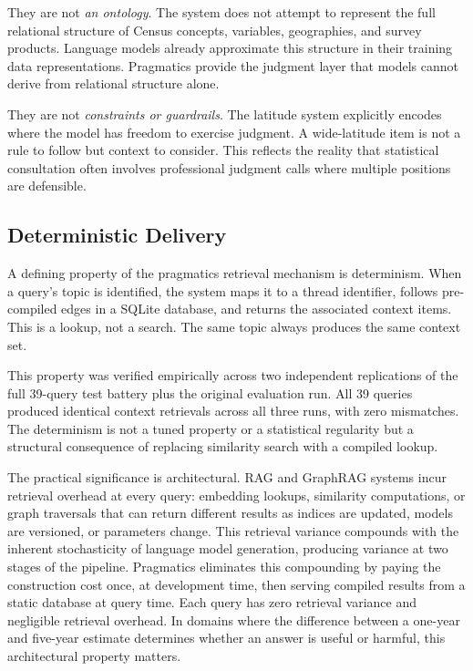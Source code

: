 \documentclass[
  11pt,
  letterpaper,
]{article}
\begin{document}
They are not \emph{an ontology}. The system does not attempt to
represent the full relational structure of Census concepts, variables,
geographies, and survey products. Language models already approximate
this structure in their training data representations. Pragmatics
provide the judgment layer that models cannot derive from relational
structure alone.

They are not \emph{constraints or guardrails}. The latitude system
explicitly encodes where the model has freedom to exercise judgment. A
wide-latitude item is not a rule to follow but context to consider. This
reflects the reality that statistical consultation often involves
professional judgment calls where multiple positions are defensible.

\subsection{Deterministic Delivery}\label{deterministic-delivery}

A defining property of the pragmatics retrieval mechanism is
determinism. When a query's topic is identified, the system maps it to a
thread identifier, follows pre-compiled edges in a SQLite database, and
returns the associated context items. This is a lookup, not a search.
The same topic always produces the same context set.

This property was verified empirically across two independent
replications of the full 39-query test battery plus the original
evaluation run. All 39 queries produced identical context retrievals
across all three runs, with zero mismatches. The determinism is not a
tuned property or a statistical regularity but a structural consequence
of replacing similarity search with a compiled lookup.

The practical significance is architectural. RAG and GraphRAG systems
incur retrieval overhead at every query: embedding lookups, similarity
computations, or graph traversals that can return different results as
indices are updated, models are versioned, or parameters change. This
retrieval variance compounds with the inherent stochasticity of language
model generation, producing variance at two stages of the pipeline.
Pragmatics eliminates this compounding by paying the construction cost
once, at development time, then serving compiled results from a static
database at query time. Each query has zero retrieval variance and
negligible retrieval overhead. In domains where the difference between a
one-year and five-year estimate determines whether an answer is useful
or harmful, this architectural property matters.
\end{document}
